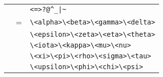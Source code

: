 \begin{isabellebody}
\begin{isamarkuptext}
\begin{center}
\begin{supertabular}{rcl}
    & & \verb|<|\isa{{\isachardoublequote}\ \ {\isacharbar}\ \ {\isachardoublequote}}\verb|=|\isa{{\isachardoublequote}\ \ {\isacharbar}\ \ {\isachardoublequote}}\verb|>|\isa{{\isachardoublequote}\ \ {\isacharbar}\ \ {\isachardoublequote}}\verb|?|\isa{{\isachardoublequote}\ \ {\isacharbar}\ \ {\isachardoublequote}}\verb|@|\isa{{\isachardoublequote}\ \ {\isacharbar}\ \ {\isachardoublequote}}\verb|^|\isa{{\isachardoublequote}\ \ {\isacharbar}\ \ {\isachardoublequote}}\verb|_|\isa{{\isachardoublequote}\ \ {\isacharbar}\ \ {\isachardoublequote}}\verb||\verb,|,\verb||\isa{{\isachardoublequote}\ \ {\isacharbar}\ \ {\isachardoublequote}}\verb|~| \\
     & = & \verb|\<alpha>|\isa{{\isachardoublequote}\ \ {\isacharbar}\ \ {\isachardoublequote}}\verb|\<beta>|\isa{{\isachardoublequote}\ \ {\isacharbar}\ \ {\isachardoublequote}}\verb|\<gamma>|\isa{{\isachardoublequote}\ \ {\isacharbar}\ \ {\isachardoublequote}}\verb|\<delta>|\isa{{\isachardoublequote}\ \ {\isacharbar}{\isachardoublequote}} \\
          &   & \verb|\<epsilon>|\isa{{\isachardoublequote}\ \ {\isacharbar}\ \ {\isachardoublequote}}\verb|\<zeta>|\isa{{\isachardoublequote}\ \ {\isacharbar}\ \ {\isachardoublequote}}\verb|\<eta>|\isa{{\isachardoublequote}\ \ {\isacharbar}\ \ {\isachardoublequote}}\verb|\<theta>|\isa{{\isachardoublequote}\ \ {\isacharbar}{\isachardoublequote}} \\
          &   & \verb|\<iota>|\isa{{\isachardoublequote}\ \ {\isacharbar}\ \ {\isachardoublequote}}\verb|\<kappa>|\isa{{\isachardoublequote}\ \ {\isacharbar}\ \ {\isachardoublequote}}\verb|\<mu>|\isa{{\isachardoublequote}\ \ {\isacharbar}\ \ {\isachardoublequote}}\verb|\<nu>|\isa{{\isachardoublequote}\ \ {\isacharbar}{\isachardoublequote}} \\
          &   & \verb|\<xi>|\isa{{\isachardoublequote}\ \ {\isacharbar}\ \ {\isachardoublequote}}\verb|\<pi>|\isa{{\isachardoublequote}\ \ {\isacharbar}\ \ {\isachardoublequote}}\verb|\<rho>|\isa{{\isachardoublequote}\ \ {\isacharbar}\ \ {\isachardoublequote}}\verb|\<sigma>|\isa{{\isachardoublequote}\ \ {\isacharbar}\ \ {\isachardoublequote}}\verb|\<tau>|\isa{{\isachardoublequote}\ \ {\isacharbar}{\isachardoublequote}} \\
          &   & \verb|\<upsilon>|\isa{{\isachardoublequote}\ \ {\isacharbar}\ \ {\isachardoublequote}}\verb|\<phi>|\isa{{\isachardoublequote}\ \ {\isacharbar}\ \ {\isachardoublequote}}\verb|\<chi>|\isa{{\isachardoublequote}\ \ {\isacharbar}\ \ {\isachardoublequote}}\verb|\<psi>|\isa{{\isachardoublequote}\ \ {\isacharbar}{\isachardoublequote}} \\

\end{supertabular}
\end{center}
\end{isamarkuptext}
\end{isabellebody}
